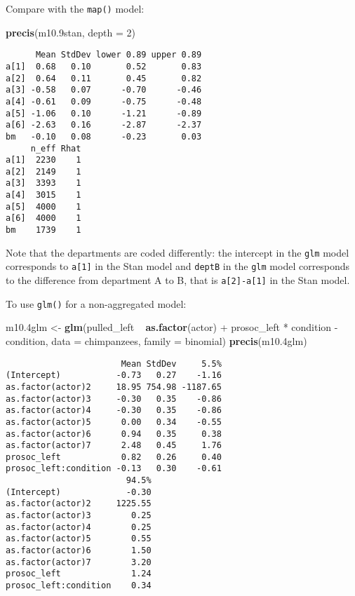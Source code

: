 \documentclass[]{tufte-handout}
\newenvironment{Shaded}{}{}
\newcommand{\KeywordTok}[1]{\textcolor[rgb]{0.00,0.44,0.13}{\textbf{#1}}}
\newcommand{\DataTypeTok}[1]{\textcolor[rgb]{0.56,0.13,0.00}{#1}}
\newcommand{\DecValTok}[1]{\textcolor[rgb]{0.25,0.63,0.44}{#1}}
\newcommand{\FloatTok}[1]{\textcolor[rgb]{0.25,0.63,0.44}{#1}}
\newcommand{\StringTok}[1]{\textcolor[rgb]{0.25,0.44,0.63}{#1}}
\newcommand{\OperatorTok}[1]{\textcolor[rgb]{0.40,0.40,0.40}{#1}}
\newcommand{\NormalTok}[1]{#1}
\begin{document}
Compare with the \texttt{map()} model:

\begin{Shaded}
\begin{Highlighting}[]
\KeywordTok{precis}\NormalTok{(m10}\FloatTok{.9}\NormalTok{stan, }\DataTypeTok{depth =} \DecValTok{2}\NormalTok{)}
\end{Highlighting}
\end{Shaded}

\begin{verbatim}
      Mean StdDev lower 0.89 upper 0.89
a[1]  0.68   0.10       0.52       0.83
a[2]  0.64   0.11       0.45       0.82
a[3] -0.58   0.07      -0.70      -0.46
a[4] -0.61   0.09      -0.75      -0.48
a[5] -1.06   0.10      -1.21      -0.89
a[6] -2.63   0.16      -2.87      -2.37
bm   -0.10   0.08      -0.23       0.03
     n_eff Rhat
a[1]  2230    1
a[2]  2149    1
a[3]  3393    1
a[4]  3015    1
a[5]  4000    1
a[6]  4000    1
bm    1739    1
\end{verbatim}

Note that the departments are coded differently: the intercept in the
\texttt{glm} model corresponds to \texttt{a{[}1{]}} in the Stan model
and \texttt{deptB} in the \texttt{glm} model corresponds to the
difference from department A to B, that is \texttt{a{[}2{]}-a{[}1{]}} in
the Stan model.

To use \texttt{glm()} for a non-aggregated model:

\begin{Shaded}
\begin{Highlighting}[]
\NormalTok{m10}\FloatTok{.4}\NormalTok{glm <-}\StringTok{ }\KeywordTok{glm}\NormalTok{(pulled_left }\OperatorTok{~}\StringTok{ }\KeywordTok{as.factor}\NormalTok{(actor) }\OperatorTok{+}\StringTok{ }
\StringTok{    }\NormalTok{prosoc_left }\OperatorTok{*}\StringTok{ }\NormalTok{condition }\OperatorTok{-}\StringTok{ }\NormalTok{condition, }\DataTypeTok{data =}\NormalTok{ chimpanzees, }
    \DataTypeTok{family =}\NormalTok{ binomial)}
\KeywordTok{precis}\NormalTok{(m10}\FloatTok{.4}\NormalTok{glm)}
\end{Highlighting}
\end{Shaded}

\begin{verbatim}
                       Mean StdDev     5.5%
(Intercept)           -0.73   0.27    -1.16
as.factor(actor)2     18.95 754.98 -1187.65
as.factor(actor)3     -0.30   0.35    -0.86
as.factor(actor)4     -0.30   0.35    -0.86
as.factor(actor)5      0.00   0.34    -0.55
as.factor(actor)6      0.94   0.35     0.38
as.factor(actor)7      2.48   0.45     1.76
prosoc_left            0.82   0.26     0.40
prosoc_left:condition -0.13   0.30    -0.61
                        94.5%
(Intercept)             -0.30
as.factor(actor)2     1225.55
as.factor(actor)3        0.25
as.factor(actor)4        0.25
as.factor(actor)5        0.55
as.factor(actor)6        1.50
as.factor(actor)7        3.20
prosoc_left              1.24
prosoc_left:condition    0.34
\end{verbatim}
\end{document}

